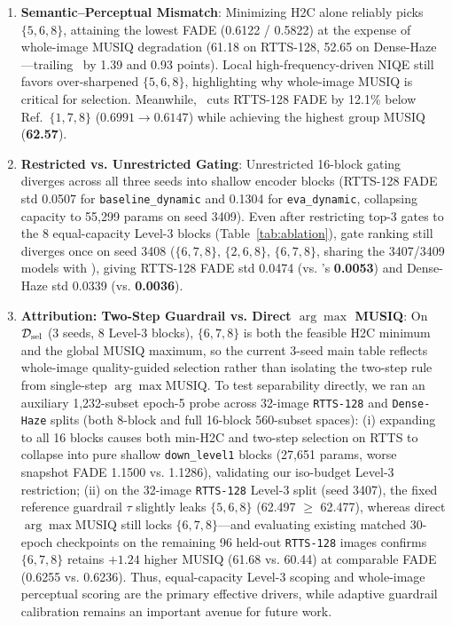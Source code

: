 \documentclass[10pt,twocolumn,letterpaper]{article}
\begin{document}
\begin{enumerate}\setlength{\itemsep}{1pt}\setlength{\parskip}{0pt}
\item \textbf{Semantic--Perceptual Mismatch}: Minimizing H2C alone reliably picks $\{5,6,8\}$, attaining the lowest FADE (0.6122 / 0.5822) at the expense of whole-image MUSIQ degradation (61.18 on RTTS-128, 52.65 on Dense-Haze---trailing \method~by 1.39 and 0.93 points). Local high-frequency-driven NIQE still favors over-sharpened $\{5,6,8\}$, highlighting why whole-image MUSIQ is critical for selection. Meanwhile, \method~cuts RTTS-128 FADE by 12.1\% below Ref.~\(\{1,7,8\}\) ($0.6991 \to 0.6147$) while achieving the highest group MUSIQ (\textbf{62.57}).
\item \textbf{Restricted vs. Unrestricted Gating}: Unrestricted 16-block gating diverges across all three seeds into shallow encoder blocks (RTTS-128 FADE std 0.0507 for \texttt{baseline\_dynamic} and 0.1304 for \texttt{eva\_dynamic}, collapsing capacity to 55,299 params on seed 3409). Even after restricting top-3 gates to the 8 equal-capacity Level-3 blocks (Table~\ref{tab:ablation}), gate ranking still diverges once on seed 3408 ($\{6,7,8\}$, $\{2,6,8\}$, $\{6,7,8\}$, sharing the 3407/3409 models with \method), giving RTTS-128 FADE std 0.0474 (vs. \method's \textbf{0.0053}) and Dense-Haze std 0.0339 (vs. \textbf{0.0036}).
\item \textbf{Attribution: Two-Step Guardrail vs. Direct $\arg\max$ MUSIQ}: On $\mathcal{D}_{\rm sel}$ (3 seeds, 8 Level-3 blocks), $\{6,7,8\}$ is both the feasible H2C minimum and the global MUSIQ maximum, so the current 3-seed main table reflects whole-image quality-guided selection rather than isolating the two-step rule from single-step $\arg\max\mathrm{MUSIQ}$. To test separability directly, we ran an auxiliary 1,232-subset epoch-5 probe across 32-image \texttt{RTTS-128} and \texttt{Dense-Haze} splits (both 8-block and full 16-block 560-subset spaces): (i) expanding to all 16 blocks causes both min-H2C and two-step selection on RTTS to collapse into pure shallow \texttt{down\_level1} blocks (27,651 params, worse snapshot FADE 1.1500 vs. 1.1286), validating our iso-budget Level-3 restriction; (ii) on the 32-image \texttt{RTTS-128} Level-3 split (seed 3407), the fixed reference guardrail $\tau$ slightly leaks $\{5,6,8\}$ (62.497 $\ge$ 62.477), whereas direct $\arg\max\mathrm{MUSIQ}$ still locks $\{6,7,8\}$---and evaluating existing matched 30-epoch checkpoints on the remaining 96 held-out \texttt{RTTS-128} images confirms $\{6,7,8\}$ retains $+1.24$ higher MUSIQ (61.68 vs. 60.44) at comparable FADE (0.6255 vs. 0.6236). Thus, equal-capacity Level-3 scoping and whole-image perceptual scoring are the primary effective drivers, while adaptive guardrail calibration remains an important avenue for future work.
\end{enumerate}
\end{document}

